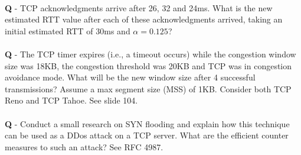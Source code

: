 \documentclass{llncs}
\newcounter{ques}
\newcommand{\quest}[2]{\paragraph{}\textbf{Q\theques} - #1\stepcounter{ques} }
\newcommand{\answer}[1]{}%
\begin{document}
\quest{TCP acknowledgments arrive after 26, 32 and 24ms. What is the
  new estimated RTT value after each of these acknowledgments
  arrived, taking an initial estimated RTT of 30ms and $\alpha=0.125$?}{1} 

\answer{See slide 62}

\quest{The TCP timer expires (i.e., a timeout occurs) while the
  congestion window size was 18KB, the congestion threshold was 20KB
  and TCP was in congestion avoidance mode. What will be the new
  window size after 4 successful transmissions? Assume a max segment
  size (MSS) of 1KB. Consider both TCP Reno and TCP Tahoe.}

\answer{See slide 104.}

\quest{Conduct a small research on SYN flooding and explain how this
  technique can be used as a DDos attack on a TCP server. What are the
  efficient counter measures to such an attack?}

\answer{See RFC 4987.}
\end{document}
